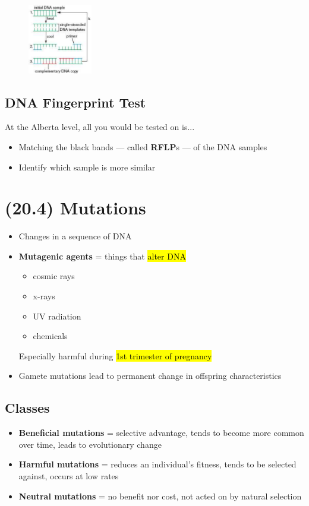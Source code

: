\documentclass[a4paper,12pt]{article}
\begin{document}
\begin{figure}[H]
    \centering
    \includegraphics[width=0.25\textwidth]{taq}
\end{figure}

\subsection{DNA Fingerprint Test}
At the Alberta level, all you would be tested on is...
\begin{itemize}
    \item{Matching the black bands --- called \textbf{RFLP}s --- of the DNA samples}
    \item{Identify which sample is more similar}
\end{itemize}


\section{(20.4) Mutations}
\begin{itemize}
    \item{Changes in a sequence of DNA}
    \item{
            \textbf{Mutagenic agents} = things that \hl{alter DNA}
            \begin{itemize}
                \item{cosmic rays}
                \item{x-rays}
                \item{UV radiation}
                \item{chemicals}
            \end{itemize}
            Especially harmful during \hl{1st trimester of pregnancy}
        }
    \item{Gamete mutations lead to permanent change in offspring characteristics}
\end{itemize}

\subsection{Classes}
\begin{itemize}
    \item{\textbf{Beneficial mutations} = selective advantage, tends to become more common over time, leads to evolutionary change}
    \item{\textbf{Harmful mutations} = reduces an individual's fitness, tends to be selected against, occurs at low rates}
    \item{\textbf{Neutral mutations} = no benefit nor cost, not acted on by natural selection}
\end{itemize}
\end{document}

